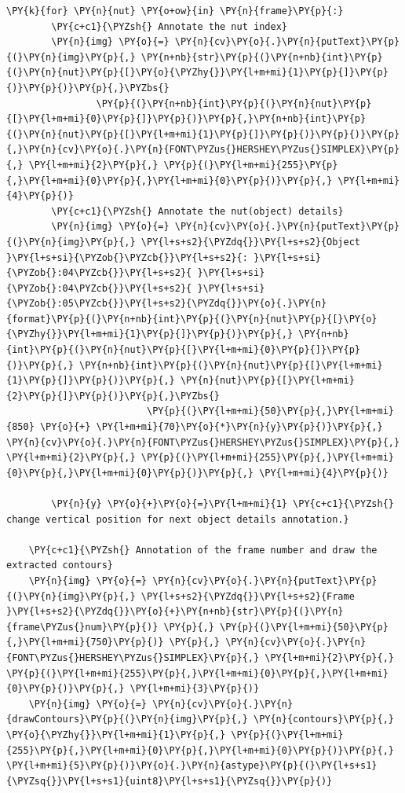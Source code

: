 \documentclass[a4paper,11pt]{article}%
\begin{document}
\begin{tcolorbox}[breakable, size=fbox, boxrule=1pt, pad at break*=1mm,colback=cellbackground, colframe=cellborder]
\begin{Verbatim}[commandchars=\\\{\}]
    \PY{k}{for} \PY{n}{nut} \PY{o+ow}{in} \PY{n}{frame}\PY{p}{:}
        \PY{c+c1}{\PYZsh{} Annotate the nut index}
        \PY{n}{img} \PY{o}{=} \PY{n}{cv}\PY{o}{.}\PY{n}{putText}\PY{p}{(}\PY{n}{img}\PY{p}{,} \PY{n+nb}{str}\PY{p}{(}\PY{n+nb}{int}\PY{p}{(}\PY{n}{nut}\PY{p}{[}\PY{o}{\PYZhy{}}\PY{l+m+mi}{1}\PY{p}{]}\PY{p}{)}\PY{p}{)}\PY{p}{,}\PYZbs{}
                \PY{p}{(}\PY{n+nb}{int}\PY{p}{(}\PY{n}{nut}\PY{p}{[}\PY{l+m+mi}{0}\PY{p}{]}\PY{p}{)}\PY{p}{,}\PY{n+nb}{int}\PY{p}{(}\PY{n}{nut}\PY{p}{[}\PY{l+m+mi}{1}\PY{p}{]}\PY{p}{)}\PY{p}{)}\PY{p}{,}\PY{n}{cv}\PY{o}{.}\PY{n}{FONT\PYZus{}HERSHEY\PYZus{}SIMPLEX}\PY{p}{,} \PY{l+m+mi}{2}\PY{p}{,} \PY{p}{(}\PY{l+m+mi}{255}\PY{p}{,}\PY{l+m+mi}{0}\PY{p}{,}\PY{l+m+mi}{0}\PY{p}{)}\PY{p}{,} \PY{l+m+mi}{4}\PY{p}{)}
        \PY{c+c1}{\PYZsh{} Annotate the nut(object) details}
        \PY{n}{img} \PY{o}{=} \PY{n}{cv}\PY{o}{.}\PY{n}{putText}\PY{p}{(}\PY{n}{img}\PY{p}{,} \PY{l+s+s2}{\PYZdq{}}\PY{l+s+s2}{Object }\PY{l+s+si}{\PYZob{}\PYZcb{}}\PY{l+s+s2}{: }\PY{l+s+si}{\PYZob{}:04\PYZcb{}}\PY{l+s+s2}{ }\PY{l+s+si}{\PYZob{}:04\PYZcb{}}\PY{l+s+s2}{ }\PY{l+s+si}{\PYZob{}:05\PYZcb{}}\PY{l+s+s2}{\PYZdq{}}\PY{o}{.}\PY{n}{format}\PY{p}{(}\PY{n+nb}{int}\PY{p}{(}\PY{n}{nut}\PY{p}{[}\PY{o}{\PYZhy{}}\PY{l+m+mi}{1}\PY{p}{]}\PY{p}{)}\PY{p}{,} \PY{n+nb}{int}\PY{p}{(}\PY{n}{nut}\PY{p}{[}\PY{l+m+mi}{0}\PY{p}{]}\PY{p}{)}\PY{p}{,} \PY{n+nb}{int}\PY{p}{(}\PY{n}{nut}\PY{p}{[}\PY{l+m+mi}{1}\PY{p}{]}\PY{p}{)}\PY{p}{,} \PY{n}{nut}\PY{p}{[}\PY{l+m+mi}{2}\PY{p}{]}\PY{p}{)}\PY{p}{,}\PYZbs{}
                         \PY{p}{(}\PY{l+m+mi}{50}\PY{p}{,}\PY{l+m+mi}{850} \PY{o}{+} \PY{l+m+mi}{70}\PY{o}{*}\PY{n}{y}\PY{p}{)}\PY{p}{,} \PY{n}{cv}\PY{o}{.}\PY{n}{FONT\PYZus{}HERSHEY\PYZus{}SIMPLEX}\PY{p}{,} \PY{l+m+mi}{2}\PY{p}{,} \PY{p}{(}\PY{l+m+mi}{255}\PY{p}{,}\PY{l+m+mi}{0}\PY{p}{,}\PY{l+m+mi}{0}\PY{p}{)}\PY{p}{,} \PY{l+m+mi}{4}\PY{p}{)}

        \PY{n}{y} \PY{o}{+}\PY{o}{=}\PY{l+m+mi}{1} \PY{c+c1}{\PYZsh{} change vertical position for next object details annotation.}

    \PY{c+c1}{\PYZsh{} Annotation of the frame number and draw the extracted contours}
    \PY{n}{img} \PY{o}{=} \PY{n}{cv}\PY{o}{.}\PY{n}{putText}\PY{p}{(}\PY{n}{img}\PY{p}{,} \PY{l+s+s2}{\PYZdq{}}\PY{l+s+s2}{Frame }\PY{l+s+s2}{\PYZdq{}}\PY{o}{+}\PY{n+nb}{str}\PY{p}{(}\PY{n}{frame\PYZus{}num}\PY{p}{)} \PY{p}{,} \PY{p}{(}\PY{l+m+mi}{50}\PY{p}{,}\PY{l+m+mi}{750}\PY{p}{)} \PY{p}{,} \PY{n}{cv}\PY{o}{.}\PY{n}{FONT\PYZus{}HERSHEY\PYZus{}SIMPLEX}\PY{p}{,} \PY{l+m+mi}{2}\PY{p}{,} \PY{p}{(}\PY{l+m+mi}{255}\PY{p}{,}\PY{l+m+mi}{0}\PY{p}{,}\PY{l+m+mi}{0}\PY{p}{)}\PY{p}{,} \PY{l+m+mi}{3}\PY{p}{)}
    \PY{n}{img} \PY{o}{=} \PY{n}{cv}\PY{o}{.}\PY{n}{drawContours}\PY{p}{(}\PY{n}{img}\PY{p}{,} \PY{n}{contours}\PY{p}{,} \PY{o}{\PYZhy{}}\PY{l+m+mi}{1}\PY{p}{,} \PY{p}{(}\PY{l+m+mi}{255}\PY{p}{,}\PY{l+m+mi}{0}\PY{p}{,}\PY{l+m+mi}{0}\PY{p}{)}\PY{p}{,} \PY{l+m+mi}{5}\PY{p}{)}\PY{o}{.}\PY{n}{astype}\PY{p}{(}\PY{l+s+s1}{\PYZsq{}}\PY{l+s+s1}{uint8}\PY{l+s+s1}{\PYZsq{}}\PY{p}{)}


\end{Verbatim}
\end{tcolorbox}
\end{document}

